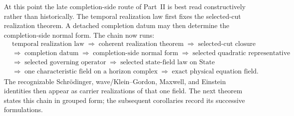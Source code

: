 At this point the late completion-side route of Part~II is best read constructively
rather than historically. The temporal realization law first fixes the
selected-cut realization theorem. A detached completion datum may then
determine the completion-side normal form. The chain now runs:
\[
\begin{aligned}
&\text{temporal realization law}
\;\Longrightarrow\;
\text{coherent realization theorem}
\;\Longrightarrow\;
\text{selected-cut closure}
\\
&\Longrightarrow\;
\text{completion datum}
\;\Longrightarrow\;
\text{completion-side normal form}
\;\Longrightarrow\;
\text{selected quadratic representative}
\\
&\Longrightarrow\;
\text{selected governing operator}
\;\Longrightarrow\;
\text{selected state-field law on }\mathrm{State}
\\
&\Longrightarrow\;
\text{one characteristic field on a horizon complex}
\;\Longrightarrow\;
\text{exact physical equation field.}
\end{aligned}
\]
The recognizable Schr\"odinger, wave/Klein--Gordon, Maxwell, and Einstein
identities then appear as carrier realizations of that one field. The next theorem
states this chain in grouped form; the subsequent corollaries record its
successive formulations.

